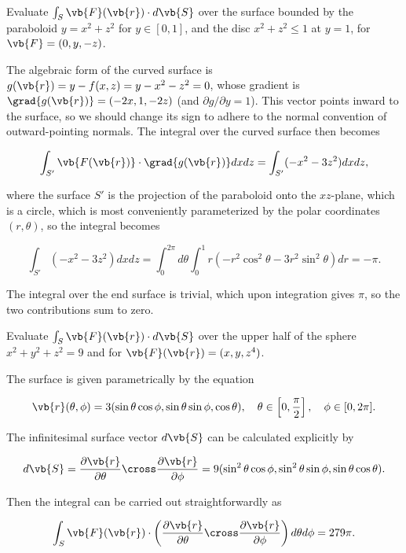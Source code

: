 \documentclass[english,a4paper,12pt]{report}
\begin{document}
{Evaluate \(\int_{S}^{}   \vb{F} (\vb{r} )\cdot d\vb{S} \) over the surface bounded by the paraboloid \(y = x^2+z^2\) for \(y \in [0,1]\), and the disc \(x^2+z^2 \le 1\) at \(y=1\), for \(\vb{F} = (0,y,-z)\).}
{The algebraic form of the curved surface is \(g(\vb{r}) = y - f(x,z) = y - x^2 - z^2 = 0\), whose gradient is \(\grad{g(\vb{r})} = (-2x,1,-2z) \) (and \(\partial g /\partial y= 1\)). This vector points inward to the surface, so we should change its sign to adhere to the normal convention of outward-pointing normals. The integral over the curved surface then becomes

\begin{equation}
	\int_{S'}^{}   \vb{F(\vb{r} )} \cdot \grad{g(\vb{r})} dxdz = \int_{S'}^{} (-x^2-3z^2)dxdz,
\end{equation}

where the surface \(S'\) is the projection of the paraboloid onto the \(xz\)-plane, which is a circle, which is most conveniently parameterized by the polar coordinates \((r,\theta )\), so the integral becomes

\begin{equation}
	\int_{S'}^{} (-x^2-3z^2)dxdz = \int_{0}^{2\pi } d \theta \int_{0}^{1} r(-r^2\cos ^2\theta - 3r^2\sin ^2\theta )dr = -\pi .   
\end{equation}

The integral over the end surface is trivial, which upon integration gives \(\pi \), so the two contributions sum to zero. 

} 

{Evaluate \(\int_{S}^{} \vb{F} (\vb{r} ) \cdot d\vb{S}  \) over the upper half of the sphere \(x^2+y^2+z^2 = 9\) and for \(\vb{F} (\vb{r} ) = (x,y,z^4)\).}
{The surface is given parametrically by the equation 

\begin{equation}
	\vb{r} (\theta , \phi ) = 3(\sin \theta \cos \phi , \sin \theta \sin \phi , \cos \theta ), \quad \theta \in \left[0,\frac{\pi }{2} \right], \quad \phi \in [0, 2\pi ].
\end{equation}

The infinitesimal surface vector \(d\vb{S} \) can be calculated explicitly by 

\begin{equation}
	d\vb{S} = \frac{\partial \vb{r} }{\partial \theta } \cross \frac{\partial \vb{r} }{\partial \phi } = 9(\sin ^2\theta \cos \phi , \sin ^2\theta \sin \phi , \sin \theta \cos \theta ).   
\end{equation}

Then the integral can be carried out straightforwardly as

\begin{equation}
	\int_{S}^{} \vb{F} (\vb{r} ) \cdot \left( \frac{\partial \vb{r} }{\partial \theta } \cross \frac{\partial \vb{r} }{\partial \phi }   \right) d \theta d\phi = 279\pi .  
\end{equation}

} 
\end{document}
